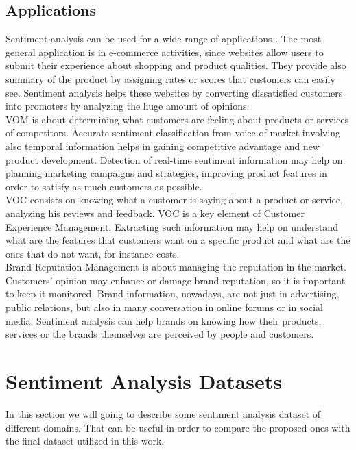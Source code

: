 \subsection{Applications}
Sentiment analysis can be used for a wide range of applications \cite{saifee2013applications}. The most general application is in e-commerce activities, since websites allow users to submit their experience about shopping and product qualities. They provide also summary of the product by assigning rates or scores that customers can easily see. Sentiment analysis helps these websites by converting dissatisfied customers into promoters by analyzing the huge amount of opinions.\\
\ac{VOM} is about determining what customers are feeling about products or services of competitors. Accurate sentiment classification from voice of market involving also temporal information helps in gaining competitive advantage and new product development. Detection of real-time sentiment information may help on planning marketing campaigns and strategies, improving product features in order to satisfy as much customers as possible.\\
\ac{VOC} consists on knowing what a customer is saying about a product or service, analyzing his reviews and feedback. \ac{VOC} is a key element of Customer Experience Management. Extracting such information may help on understand what are the features that customers want on a specific product and what are the ones that do not want, for instance costs.\\
Brand Reputation Management is about managing the reputation in the market. Customers' opinion may enhance or damage brand reputation, so it is important to keep it monitored. Brand information, nowadays, are not just in advertising, public relations, but also in many conversation in online forums or in social media. Sentiment analysis can help brands on knowing how their products, services or the brands themselves are perceived by people and customers.





\section{Sentiment Analysis Datasets}
In this section we will going to describe some sentiment analysis dataset of different domains. That can be useful in order to compare the proposed ones with the final dataset utilized in this work.

